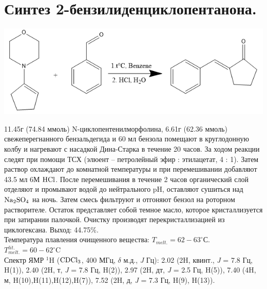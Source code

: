 \documentclass[a4paper]{article}
\begin{document}
\section{Синтез 2-бензилиденциклопентанона.}
\begin{center}
\includegraphics[scale=0.5]{pictures/1.png}
\end{center}
11.45г (74.84 ммоль) N-циклопентенилморфолина, 6.61г (62.36 ммоль) свежеперегнанного бензальдегида и 60 мл бензола помещают в круглодонную колбу и нагревают с насадкой Дина-Старка в течение 20 часов. За ходом реакции следят при помощи ТСХ (элюент -- петролейный эфир : этилацетат, 4 : 1).
Затем раствор охлаждают до комнатной температуры и при перемешивании добавляют 43.5 мл 6М $\ce{HCl}$. После перемешивания в течение 2 часов органический слой отделяют и промывают водой до нейтрального pH, оставляют сушиться над $\ce{Na2SO4}$ на ночь. Затем смесь фильтруют и отгоняют бензол на роторном растворителе. Остаток представляет собой темное масло, которое кристаллизуется при затирании палочкой. Очистку производят перекристаллизацией из циклогексана. Выход: 44.75\%.\\
Температура плавления очищенного вещества: $T_{melt.} = 62 - 63^{\circ}$С. $T_{melt.}^{lit.} = 60 - 62^{\circ}$C \cite{takeishi2004} \\
Спектр ЯМР $^{1}$H ($\ce{CDCl3}$, 400 МГц, $\delta$ м.д., \textit{J} Гц):   2.02 (2H, квинт., \textit{J} = 7.8 Гц, H(1)), 2.40 (2H, т, \textit{J} = 7.8 Гц, H(2)), 2.97 (2H, дт, \textit{J} = 2.5 Гц, H(5)), 7.40 (4H, м, H(10),H(11),H(12),H(7)), 7.52 (2H, д, \textit{J} = 7.3 Гц, H(9), H(13)). 
\end{document}
